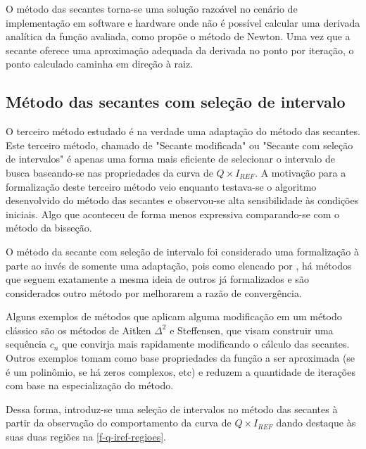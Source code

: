O método das secantes torna-se uma solução razoável no cenário de implementação em software e hardware onde não é possível calcular uma derivada analítica da função avaliada, como propõe o método de Newton. Uma vez que a secante oferece uma aproximação adequada da derivada no ponto por iteração, o ponto calculado caminha em direção à raiz.

\subsection{Método das secantes com seleção de intervalo}

O terceiro método estudado é na verdade uma adaptação do método das secantes. Este terceiro método, chamado de "Secante modificada"\; ou "Secante com seleção de intervalos"\; é apenas uma forma mais eficiente de selecionar o intervalo de busca baseando-se nas propriedades da curva de $Q \times I_{REF}$. A motivação para a formalização deste terceiro método veio enquanto testava-se o algoritmo desenvolvido do método das secantes e observou-se alta sensibilidade às condições iniciais. Algo que aconteceu de forma menos expressiva comparando-se com o método da bisseção.

O método da secante com seleção de intervalo foi considerado uma formalização à parte ao invés de somente uma adaptação, pois como elencado por \citeauthor{numerical-anal-burden}, há métodos que seguem exatamente a mesma ideia de outros já formalizados e são considerados outro método por melhorarem a razão de convergência.

Alguns exemplos de métodos que aplicam alguma modificação em um método clássico são os métodos de Aitken $\Delta^2$ e Steffensen, que visam construir uma sequência $c_n$ que convirja mais rapidamente modificando o cálculo das secantes. Outros exemplos tomam como base propriedades da função a ser aproximada (se é um polinômio, se há zeros complexos, etc) e reduzem a quantidade de iterações com base na especialização do método. 

Dessa forma, introduz-se uma seleção de intervalos no método das secantes à partir da observação do comportamento da curva de  $Q \times I_{REF}$ dando destaque às suas duas regiões na \autoref{f-q-iref-regioes}.

